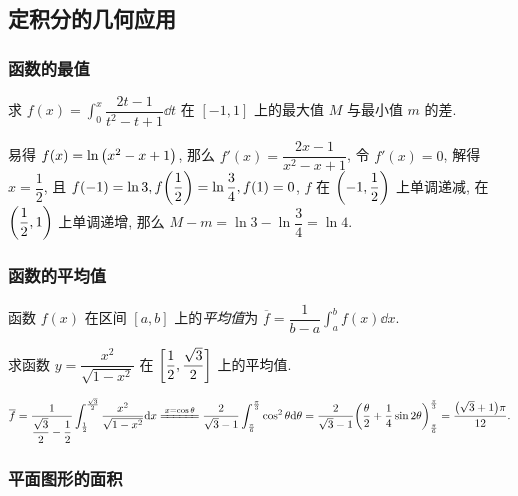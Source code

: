 \subsection{定积分的几何应用}

\subsubsection{函数的最值}

\begin{example}
    求 $\displaystyle f(x)=\int_{0}^{x} \dfrac{2t-1}{t^2-t+1} \dd t$ 在 $[-1,1]$ 上的最大值 $M$ 与最小值 $m$ 的差.
\end{example}
\begin{solution}
    易得 $f(x)=\ln\qty(x^2-x+1)$, 那么 $f'(x)=\dfrac{2x-1}{x^2-x+1}$, 令 $f'(x)=0$, 解得 $x=\dfrac{1}{2}$, 且 $f(-1)=\ln 3, f\qty(\dfrac{1}{2})=\ln\dfrac{3}{4}, f(1)=0$, $f$ 在 $\qty(-1,\dfrac{1}{2})$ 上单调递减, 在 $\qty(\dfrac{1}{2},1)$ 上单调递增, 那么 $M-m=\ln 3-\ln \dfrac{3}{4}=\ln 4.$
\end{solution}

\subsubsection{函数的平均值}

\begin{definition}[函数的平均值]
    函数 $f(x)$ 在区间 $[a,b]$ 上的\textit{平均值}为 $\displaystyle \overline{f} =\dfrac{1}{b-a}\int_{a}^{b} f(x) \dd x$.
\end{definition}

\begin{example}
    求函数 $y=\dfrac{x^2}{\sqrt{1-x^2}}$ 在 $\qty[\dfrac{1}{2},\dfrac{\sqrt{3}}{2}]$ 上的平均值.
\end{example}
\begin{solution}
    $\displaystyle \overline{f}=\dfrac{1}{\dfrac{\sqrt{3}}{2}-\dfrac{1}{2}}\int_{\frac{1}{2}}^{\frac{\sqrt{3}}{2}} \dfrac{x^2}{\sqrt{1-x^2}} \dd x\xlongequal{x=\cos\theta}\dfrac{2}{\sqrt{3}-1}\int_{\frac{\pi}{6}}^{\frac{\pi}{3}} \cos^2\theta \dd \theta=\dfrac{2}{\sqrt{3}-1}\qty(\dfrac{\theta}{2}+\dfrac{1}{4}\sin 2\theta)_{\frac{\pi}{6}}^{\frac{\pi}{3}}=\dfrac{\qty(\sqrt{3}+1)\pi}{12}.$
\end{solution}

\subsubsection{平面图形的面积}

